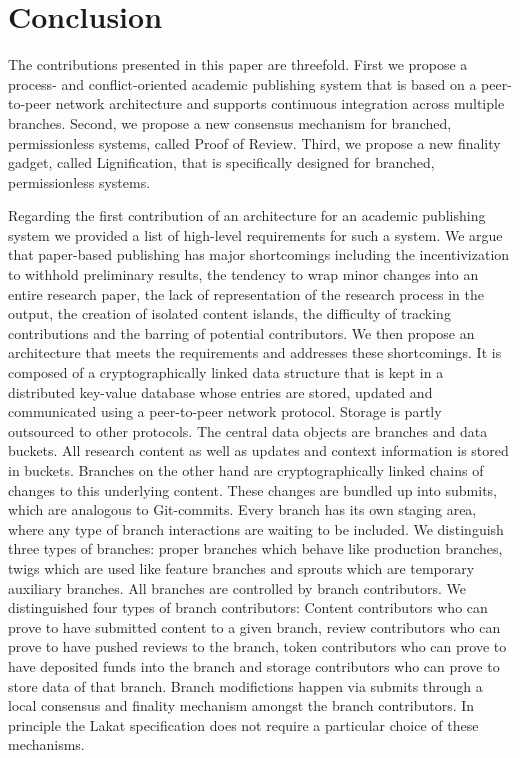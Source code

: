 \section{Conclusion}
\label{sc:conclusion}

The contributions presented in this paper are threefold. First we propose a process- and conflict-oriented academic publishing system that is based on a peer-to-peer network architecture and supports continuous integration across multiple branches. Second, we propose a new consensus mechanism for branched, permissionless systems, called Proof of Review. Third, we propose a new finality gadget, called Lignification, that is specifically designed for branched, permissionless systems. 

Regarding the first contribution of an architecture for an academic publishing system we provided a list of high-level requirements for such a system. We argue that paper-based publishing has major shortcomings including the incentivization to withhold preliminary results, the tendency to wrap minor changes into an entire research paper, the lack of representation of the research process in the output, the creation of isolated content islands, the difficulty of tracking contributions and the barring of potential contributors. We then propose an architecture that meets the requirements and addresses these shortcomings. It is composed of a cryptographically linked data structure that is kept in a distributed key-value database whose entries are stored, updated and communicated using a peer-to-peer network protocol. Storage is partly outsourced to other protocols. The central data objects are branches and data buckets. All research content as well as updates and context information is stored in buckets. Branches on the other hand are cryptographically linked chains of changes to this underlying content. These changes are bundled up into submits, which are analogous to Git-commits. Every branch has its own staging area, where any type of branch interactions are waiting to be included. We distinguish three types of branches: proper branches which behave like production branches, twigs which are used like feature branches and sprouts which are temporary auxiliary branches. All branches are controlled by branch contributors. We distinguished four types of branch contributors: Content contributors who can prove to have submitted content to a given branch, review contributors who can prove to have pushed reviews to the branch, token contributors who can prove to have deposited funds into the branch and storage contributors who can prove to store data of that branch. Branch modifictions happen via submits through a local consensus and finality mechanism amongst the branch contributors. In principle the Lakat specification does not require a particular choice of these mechanisms.

